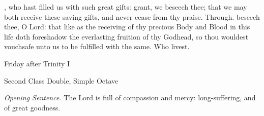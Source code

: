 
\postcommunion
{}, who hast filled us with such great gifts: grant, we beseech thee; that we may both receive these saving gifts, and never cease from thy praise. Through.
 beseech thee, O Lord: that like as the receiving of thy precious Body and Blood in this life doth foreshadow the everlasting fruition of thy Godhead, so thou wouldest vouchsafe unto us to be fulfilled with the same. Who livest.


\begin{inhead}
	{Friday after Trinity I}\par
    {Second Class Double, Simple Octave}
\end{inhead}
\par\noindent
\textit{Opening Sentence.} The Lord is full of compassion and mercy: long-suffering, and of great goodness.




